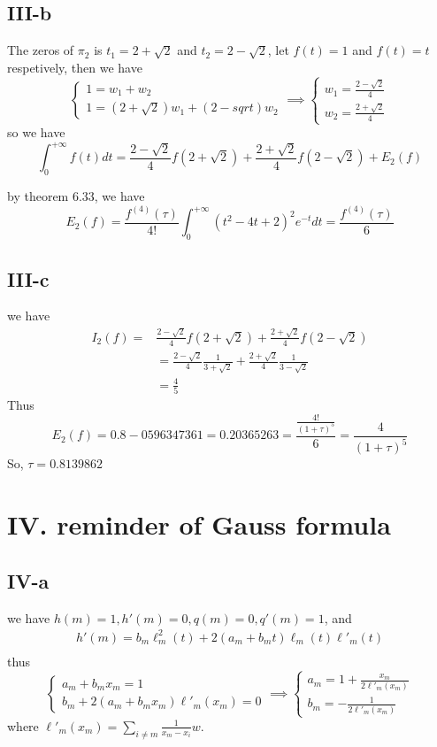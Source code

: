\documentclass[a4paper]{article}
\begin{document}
\subsection*{III-b}
The zeros of \(\pi_2\) is \(t_1 = 2+\sqrt{2}\) and \(t_2  = 2-\sqrt{2}\), let \(f(t) = 1\) and \(f(t) = t\) respetively, then we have
\[\begin{cases}
    1 = w_1 + w_2\\ 1  = (2+\sqrt{2}) w_1 + (2-sqrt) w_2
\end{cases}
\implies\begin{cases}
    w_1 = \frac{2-\sqrt{2}}{4}\\w_2=\frac{2+\sqrt{2}}{4}
\end{cases}
\]
so we have \[\int_{0}^{+\infty}f(t)dt = \frac{2-\sqrt{2}}{4}f(2+\sqrt{2}) + \frac{2+\sqrt{2}}{4} f(2-\sqrt{2})+ E_2(f)\]

by theorem 6.33, we have \[E_2(f) = \frac{f^{(4)}(\tau)}{4!}\int_{0}^{+\infty}(t^2 -4t+2)^2e^{-t}dt = \frac{f^{(4)}(\tau)}{6}\]

\subsection*{III-c}
we have \begin{align*}
I_2(f) = &\frac{2-\sqrt{2}}{4}f(2+\sqrt{2}) + \frac{2+\sqrt{2}}{4} f(2-\sqrt{2}) \\
& =\frac{2-\sqrt{2}}{4}\frac{1}{3+\sqrt{2}} + \frac{2+\sqrt{2}}{4} \frac{1}{3-\sqrt{2}}\\
& = \frac{4}{5}
\end{align*}
Thus \[E_2(f) = 0.8 - 0596347361 = 0.20365263 = \frac{\frac{4!}{(1+\tau)^5}}{6} = \frac{4}{(1+\tau)^5}\]
So, \(\tau = 0.8139862\)

\section*{IV. reminder of Gauss formula}
\subsection*{IV-a}
we have \(h(m) = 1, h'(m) = 0, q(m) = 0, q'(m) = 1\), and 
\begin{align*}
h'(m) = b_m \ell^2_m(t) + 2(a_m  + b_m t)\ell_m(t)\ell'_m(t) \\
\end{align*}
thus\[
\begin{cases}
    a_m + b_m x_m = 1\\
    b_m + 2(a_m + b_m x_m)\ell'_m(x_m) = 0
\end{cases}\implies
\begin{cases}
    a_m = 1  + \frac{x_m}{2\ell'_m(x_m)}\\
    b_m = -\frac{1}{2\ell'_m(x_m)}
\end{cases}
\]
where \(\ell'_m(x_m) = \sum_{i \neq m} \frac{1}{x_m-x_i}w\).
\end{document}
